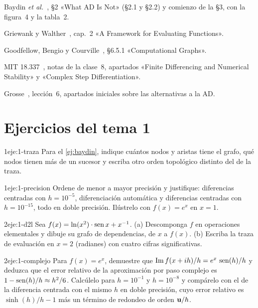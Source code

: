 \begin{lecturas}
\item Baydin \emph{et al.}~\cite{baydin}, §2 «What AD Is Not» (§2.1 y §2.2) y comienzo de la §3, con la figura~4 y la tabla~2.
\item Griewank y Walther~\cite{gw}, cap.~2 «A Framework for Evaluating Functions».
\item Goodfellow, Bengio y Courville~\cite{gbc}, §6.5.1 «Computational Graphs».
\item MIT 18.337~\cite{mit18337}, notas de la clase~8, apartados «Finite Differencing and Numerical Stability» y «Complex Step Differentiation».
\item Grosse~\cite{grosse}, lección~6, apartados iniciales sobre las alternativas a la AD.
\end{lecturas}

\section*{Ejercicios del tema 1}

\begin{ejercicio}{1}{eje:1-traza}
Para el \cref{ej:baydin}, indique cuántos nodos y aristas tiene el grafo, qué nodos tienen más de un sucesor y escriba otro orden topológico distinto del de la traza.
\end{ejercicio}

\begin{ejercicio}{1}{eje:1-precision}
Ordene de menor a mayor precisión y justifique: diferencias centradas con $h=10^{-5}$, diferenciación automática y diferencias centradas con $h=10^{-15}$, todo en doble precisión. Ilústrelo con $f(x)=e^{x}$ en $x=1$.
\end{ejercicio}

\begin{ejercicio}{2}{eje:1-d2l}
Sea $f(x)=\ln(x^{2})\cdot\operatorname{sen} x+x^{-1}$. (a) Descomponga $f$ en operaciones elementales y dibuje su grafo de dependencias, de $x$ a $f(x)$. (b) Escriba la traza de evaluación en $x=2$ (radianes) con cuatro cifras significativas.
\end{ejercicio}

\begin{ejercicio}{2}{eje:1-complejo}
Para $f(x)=e^{x}$, demuestre que $\operatorname{Im}f(x+ih)/h=e^{x}\,\operatorname{sen}(h)/h$ y deduzca que el error relativo de la aproximación por paso complejo es $1-\operatorname{sen}(h)/h\approx h^{2}/6$. Calcúlelo para $h=10^{-1}$ y $h=10^{-8}$ y compárelo con el de la diferencia centrada con el mismo $h$ en doble precisión, cuyo error relativo es $\sinh(h)/h-1$ más un término de redondeo de orden $\mathbf{u}/h$.
\end{ejercicio}

